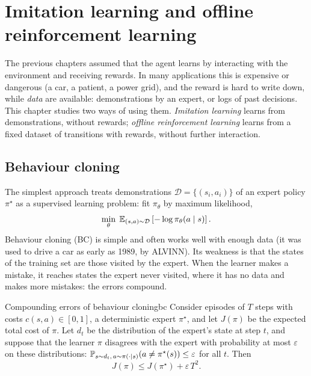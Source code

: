 \chapter[Imitation learning and offline RL]{Imitation learning and offline
  reinforcement learning}
\label{ch:imitation}

The previous chapters assumed that the agent learns by interacting with the
environment and receiving rewards. In many applications this is expensive
or dangerous (a car, a patient, a power grid), and the reward is hard to
write down, while \emph{data} are available: demonstrations by an expert,
or logs of past decisions. This chapter studies two ways of using them.
\emph{Imitation learning} learns from demonstrations, without rewards;
\emph{offline reinforcement learning} learns from a fixed dataset of
transitions with rewards, without further interaction.

\section{Behaviour cloning}

The simplest approach treats demonstrations $\mathcal{D} = \{(s_i, a_i)\}$
of an expert policy $\pi^\star$ as a supervised learning problem: fit
$\pi_\theta$ by maximum likelihood,
\begin{equation}
  \min_\theta\; \mathbb{E}_{(s, a) \sim \mathcal{D}}\left[ -\log \pi_\theta(a \mid
  s) \right].
\end{equation}
Behaviour cloning (BC) is simple and often works well with enough data
(it was used to drive a car as early as 1989, by ALVINN). Its weakness is
that the states of the training set are those visited by the expert. When
the learner makes a mistake, it reaches states the expert never visited,
where it has no data and makes more mistakes: the errors compound.

\begin{theorem}{Compounding errors of behaviour cloning}{bc}
  Consider episodes of $T$ steps with costs $c(s, a) \in [0, 1]$, a
  deterministic expert $\pi^\star$, and let $J(\pi)$ be the expected total
  cost of $\pi$. Let $d_t$ be the distribution of the expert's state at step
  $t$, and suppose that the learner $\pi$ disagrees with the expert with
  probability at most $\varepsilon$ on these distributions:
  $\mathbb{P}_{s \sim d_t,\, a \sim \pi(\cdot \mid s)}(a \neq \pi^\star(s)) \leq
  \varepsilon$ for all $t$. Then
  \begin{equation}
    J(\pi) \leq J(\pi^\star) + \varepsilon\, T^2.
  \end{equation}
\end{theorem}

